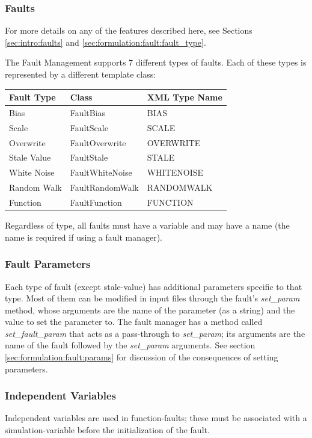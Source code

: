 \documentclass[11pt,fleqn]{report}
\begin{document}
\subsubsection {Faults} \label{sec:UG:components:faults}
\par For more details on any of the features described here, see Sections
\ref{sec:intro:faults} and \ref{sec:formulation:fault:fault_type}.

The Fault Management supports 7 different types of faults.
Each of these types is represented by a different template class:
\begin{center}\begin{tabular}{|l|l|l|} \hline
\textbf{Fault Type} & \textbf{Class} & \textbf{XML Type Name} \\ \hline
Bias & FaultBias & BIAS \\ \hline
Scale & FaultScale & SCALE \\ \hline
Overwrite & FaultOverwrite & OVERWRITE \\ \hline
Stale Value & FaultStale & STALE \\ \hline
White Noise & FaultWhiteNoise & WHITENOISE \\ \hline
Random Walk & FaultRandomWalk & RANDOMWALK \\ \hline
Function & FaultFunction & FUNCTION \\ \hline
\end{tabular}\end{center}
Regardless of type, all faults must have a variable and may have a name (the
name is required if using a fault manager).

\subsubsection {Fault Parameters}
Each type of fault (except stale-value) has additional parameters specific to
that type.
Most of them can be modified in input files through the fault's
\textit{set\_param} method, whose arguments are the name of the parameter (as a
string) and the value to set the parameter to.
The fault manager has a method called \textit{set\_fault\_param} that acts as a
pass-through to \textit{set\_param}; its arguments are the name of the fault
followed by the \textit{set\_param} arguments. See section
\ref{sec:formulation:fault:params} for discussion of the consequences of setting
parameters.



\subsubsection{Independent Variables}
Independent variables are used in function-faults; these must be associated with
a simulation-variable before the initialization of the fault.
\end{document}

